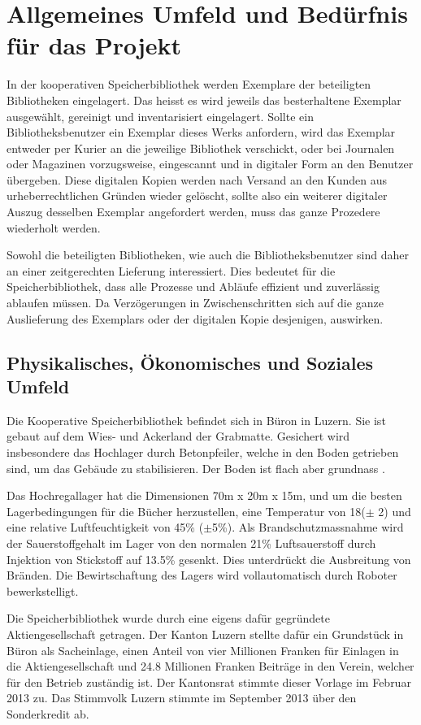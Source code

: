 \chapter{Allgemeines Umfeld und Bedürfnis für das Projekt}
In der kooperativen Speicherbibliothek werden Exemplare der beteiligten Bibliotheken eingelagert. Das heisst es wird jeweils das besterhaltene Exemplar ausgewählt, gereinigt und inventarisiert eingelagert. Sollte ein Bibliotheksbenutzer ein Exemplar dieses Werks anfordern, wird das Exemplar entweder per Kurier an die jeweilige Bibliothek verschickt, oder bei Journalen oder Magazinen vorzugsweise, eingescannt und in digitaler Form an den Benutzer übergeben. Diese digitalen Kopien werden nach Versand an den Kunden aus urheberrechtlichen Gründen wieder gelöscht, sollte also ein weiterer digitaler Auszug desselben Exemplar angefordert werden, muss das ganze Prozedere wiederholt werden.

Sowohl die beteiligten Bibliotheken, wie auch die Bibliotheksbenutzer sind daher an einer zeitgerechten Lieferung interessiert. Dies bedeutet für die Speicherbibliothek, dass alle Prozesse und Abläufe effizient und zuverlässig ablaufen müssen. Da Verzögerungen in Zwischenschritten sich auf die ganze Auslieferung des Exemplars oder der digitalen Kopie desjenigen, auswirken.

\section{Physikalisches, Ökonomisches und Soziales Umfeld}
Die Kooperative Speicherbibliothek befindet sich in Büron in Luzern. Sie ist gebaut auf dem Wies- und Ackerland der Grabmatte. Gesichert wird insbesondere das Hochlager durch Betonpfeiler, welche in den Boden getrieben sind, um das Gebäude zu stabilisieren. Der Boden ist flach aber grundnass \parencite{GeoMapAdmin2019}.

Das Hochregallager hat die Dimensionen 70m x 20m x 15m, und um die besten Lagerbedingungen für die Bücher herzustellen, eine Temperatur von 18\SIUnitSymbolDegree ($\pm$ 2) und eine relative Luftfeuchtigkeit von 45\% ($\pm$5\%). Als Brandschutzmassnahme wird der Sauerstoffgehalt im Lager von den normalen 21\% Luftsauerstoff durch Injektion von Stickstoff auf 13.5\% gesenkt. Dies unterdrückt die Ausbreitung von Bränden.
Die Bewirtschaftung des Lagers wird vollautomatisch durch Roboter bewerkstelligt.

Die Speicherbibliothek wurde durch eine eigens dafür gegründete Aktiengesellschaft getragen. Der Kanton Luzern stellte dafür ein Grundstück in Büron als Sacheinlage, einen Anteil von vier Millionen Franken für Einlagen in die Aktiengesellschaft und 24.8 Millionen Franken Beiträge in den Verein, welcher für den Betrieb zuständig ist. Der Kantonsrat stimmte dieser Vorlage im Februar 2013 zu. Das Stimmvolk Luzern stimmte im September 2013 über den Sonderkredit ab. 

